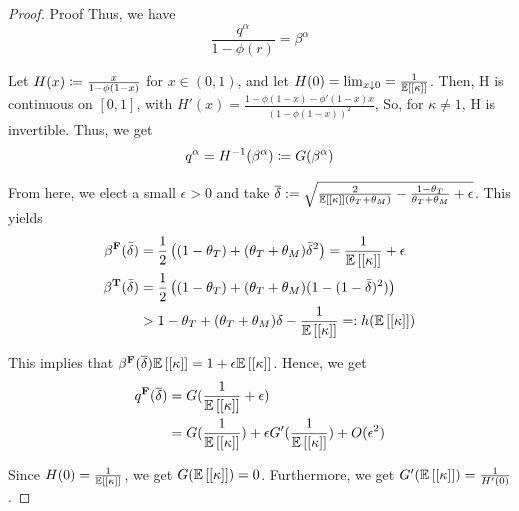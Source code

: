 \begin{proof}{Proof}
Thus, we have
\begin{equation}
    \frac{q^\alpha}{1 - \phi(r)} = \beta^\alpha 
\end{equation}

Let $H(x) \coloneqq \frac{x}{1 - \phi(1-x)}$ for $x \in (0,1)$, and let $H(0) = \lim_{x \downarrow 0} = \frac{1}{\mathbb{E}\left[ [\kappa]\right]}$. Then, H is continuous on $[0,1]$, with $H'(x) = \frac{1 -\phi(1-x) - \phi'(1-x)x }{(1-\phi(1-x))^2}$, So, for $\kappa \neq 1$, H is invertible. Thus, we get
\begin{equation}
    q^\alpha = H^{-1} (\beta^\alpha) \coloneqq G(\beta^\alpha)
\end{equation}

From here, we  elect a small $\epsilon>0$ and take $\overline{\delta} := \sqrt{\frac{2}{\mathbb{E}\left[ [\kappa]\right] (\theta_T + \theta_M)} - \frac{1-\theta_T}{\theta_T + \theta_M} + \epsilon}$.  This yields
\begin{align*}
    \beta^{\mathbf{F}}(\bar{\delta}) &= \frac{1}{2} \left((1-\theta_T) + (\theta_T + \theta_M ) \bar{\delta}^2 \right) = \frac{1}{\mathbb{E}\left[ [\kappa]\right]} + \epsilon \\
    \beta^{\mathbf{T}}(\bar{\delta}) &=  \frac{1}{2} \left((1-\theta_T) + (\theta_T + \theta_M ) (1 - (1-\bar{\delta})^2) \right) \\
    &> 1 - \theta_T + (\theta_T + \theta_M ) \delta - \frac{1}{\mathbb{E}\left[ [\kappa]\right]} =: h(\mathbb{E}\left[ [\kappa]\right]) 
\end{align*}

This implies that $\beta^{\mathbf{F}}(\overline{\delta}) \mathbb{E}\left[ [\kappa]\right] = 1 + \epsilon \mathbb{E}\left[ [\kappa]\right]$.
Hence, we get
\begin{align*}
    q^{\mathbf{F}} (\overline{\delta}) &= G(\frac{1}{\mathbb{E}\left[ [\kappa]\right]} + \epsilon) \\
    &= G(\frac{1}{\mathbb{E}\left[ [\kappa]\right]})   + \epsilon G'(\frac{1}{\mathbb{E}\left[ [\kappa]\right]}) + O(\epsilon^2) 
\end{align*}

Since $H(0) = \frac{1}{\mathbb{E}\left[ [\kappa]\right]}$, we get $G(\mathbb{E}\left[ [\kappa]\right]) = 0$. Furthermore, we get $G'(\mathbb{E}\left[ [\kappa]\right]) = \frac{1}{H'(0)}$. 



\end{proof}
